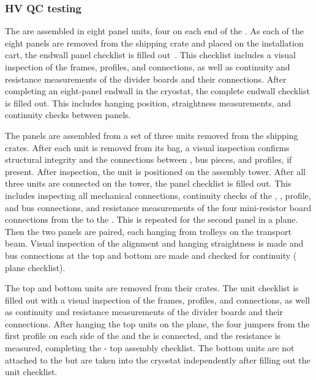 \subsubsection{HV QC testing}

The  are assembled in eight panel units, four on each end of the .  
As each of the eight panels are removed from the shipping crate and placed on the installation cart, the endwall panel checklist is filled out~\cite{bib:docdb10452}.
This checklist includes a visual inspection of the frames, profiles, and connections, as well as continuity and resistance measurements of the divider boards and their connections.  
After completing an eight-panel endwall in the cryostat, the complete endwall checklist is filled out.  
This includes hanging position, straightness measurements, and continuity checks between panels.

The  panels are assembled from a set of three units removed from the shipping crates.  
After each unit is removed from its bag, a visual inspection confirms structural integrity and the connections between ,  bus pieces, and profiles, if present.  
After inspection, the unit is positioned on the  assembly tower.  
After all three units are connected on the tower, the  panel checklist is filled out.  
This includes inspecting all mechanical connections, continuity checks of the , , profile, and  bus connections, and resistance measurements of the four mini-resistor board connections from the  to the .  
This is repeated for the second panel in a  plane.  Then the two panels are paired, each hanging from trolleys on the transport beam.  
Visual inspection of the alignment and hanging straightness is made and  bus connections at the top and bottom are made and checked for continuity ( plane checklist).

The  top and bottom units are removed from their crates.  The  unit checklist is filled out with a visual inspection of the frames, profiles, and connections, as well as continuity and resistance measurements of the divider boards and their connections.  
After hanging the top  units on the  plane, the four jumpers from the first  profile on each side of the  and the   is connected, and the resistance is measured, completing the - top assembly checklist. 
The  bottom units are not attached to the  but are taken into the cryostat independently after filling out the  unit checklist.

